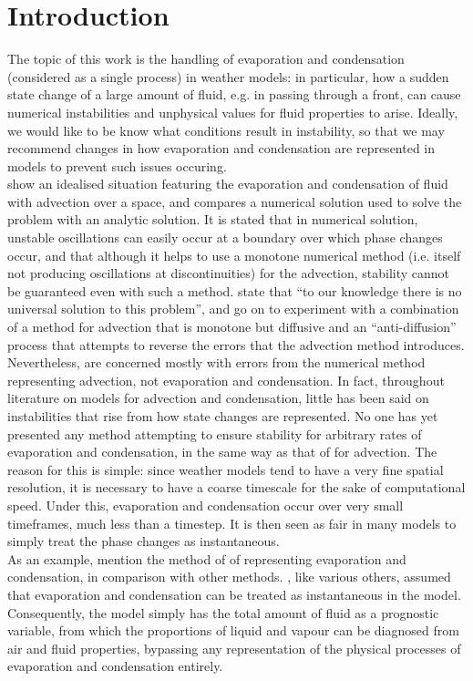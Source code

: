 \documentclass[11pt]{article}
\begin{document}
\section{Introduction}
The topic of this work is the handling of evaporation and condensation (considered as a single process) in weather models: in particular, how a sudden state change of a large amount of fluid, e.g. in passing through a front, can cause numerical instabilities and unphysical values for fluid properties to arise. Ideally, we would like to be know what conditions result in instability, so that we may recommend changes in how evaporation and condensation are represented in models to prevent such issues occuring. \\
\citet{GS1990} show an idealised situation featuring the evaporation and condensation of fluid with advection over a space, and compares a numerical solution used to solve the problem with an analytic solution. It is stated that in numerical solution, unstable oscillations can easily occur at a boundary over which phase changes occur, and that although it helps to use a monotone numerical method (i.e. itself not producing oscillations at discontinuities) for the advection, stability cannot be guaranteed even with such a method. \citeauthor{GS1990} state that ``to our knowledge there is no universal solution to this problem'', and go on to experiment with a combination of a method for advection that is monotone but diffusive and an ``anti-diffusion'' process that attempts to reverse the errors that the advection method introduces. \\
Nevertheless, \citeauthor{GS1990} are concerned mostly with errors from the numerical method representing advection, not evaporation and condensation. In fact, throughout literature on models for advection and condensation, little has been said on instabilities that rise from how state changes are represented. No one has yet presented any method attempting to ensure stability for arbitrary rates of evaporation and condensation, in the same way as that of \citeauthor{GS1990} for advection. The reason for this is simple: since weather models tend to have a very fine spatial resolution, it is necessary to have a coarse timescale for the sake of computational speed. Under this, evaporation and condensation occur over very small timeframes, much less than a timestep. It is then seen as fair in many models to simply treat the phase changes as instantaneous. \\
As an example, \citet[p.~2095]{Wilson2008} mention the method of \citet{Smith1990} of representing evaporation and condensation, in comparison with other methods. \citeauthor{Smith1990}, like various others, assumed that evaporation and condensation can be treated as instantaneous in the model. Consequently, the model simply has the total amount of fluid as a prognostic variable, from which the proportions of liquid and vapour can be diagnosed from air and fluid properties, bypassing any representation of the physical processes of evaporation and condensation entirely. \\
\end{document}
